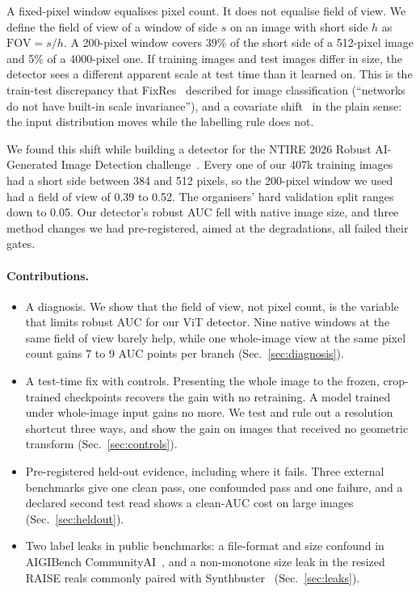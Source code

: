 \documentclass[10pt,twocolumn,letterpaper]{article}
\newcommand{\fov}{\mathrm{FOV}}
\begin{document}
A fixed-pixel window equalises pixel count. It does not equalise field of
view. We define the field of view of a window of side $s$ on an image with
short side $h$ as $\fov = s/h$. A 200-pixel window covers 39\% of the short
side of a 512-pixel image and 5\% of a 4000-pixel one. If training images and
test images differ in size, the detector sees a different apparent scale at
test time than it learned on. This is the train-test discrepancy that
FixRes~\cite{touvron2019fixres} described for image classification
(``networks do not have built-in scale invariance''), and a covariate
shift~\cite{shimodaira2000covariate} in the plain sense: the input
distribution moves while the labelling rule does not.

We found this shift while building a detector for the NTIRE 2026 Robust
AI-Generated Image Detection challenge~\cite{gushchin2026ntire}. Every one of
our 407k training images had a short side between 384 and 512 pixels, so the
200-pixel window we used had a field of view of 0.39 to 0.52. The organisers'
hard validation split ranges down to 0.05. Our detector's robust AUC fell with
native image size, and three method changes we had pre-registered, aimed at
the degradations, all failed their gates.

\paragraph{Contributions.}
\begin{itemize}
\item A diagnosis. We show that the field of view, not pixel count, is the
  variable that limits robust AUC for our ViT detector. Nine native windows at
  the same field of view barely help, while one whole-image view at the same
  pixel count gains 7 to 9 AUC points per branch (Sec.~\ref{sec:diagnosis}).
\item A test-time fix with controls. Presenting the whole image to the frozen,
  crop-trained checkpoints recovers the gain with no retraining. A model
  trained under whole-image input gains no more. We test and rule out a
  resolution shortcut three ways, and show the gain on images that received
  no geometric transform (Sec.~\ref{sec:controls}).
\item Pre-registered held-out evidence, including where it fails. Three
  external benchmarks give one clean pass, one confounded pass and one
  failure, and a declared second test read shows a clean-AUC cost on large
  images (Sec.~\ref{sec:heldout}).
\item Two label leaks in public benchmarks: a file-format and size confound in
  AIGIBench CommunityAI~\cite{li2025aigibench}, and a non-monotone size leak in
  the resized RAISE reals commonly paired with
  Synthbuster~\cite{bammey2024synthbuster} (Sec.~\ref{sec:leaks}).
\end{itemize}
\end{document}
